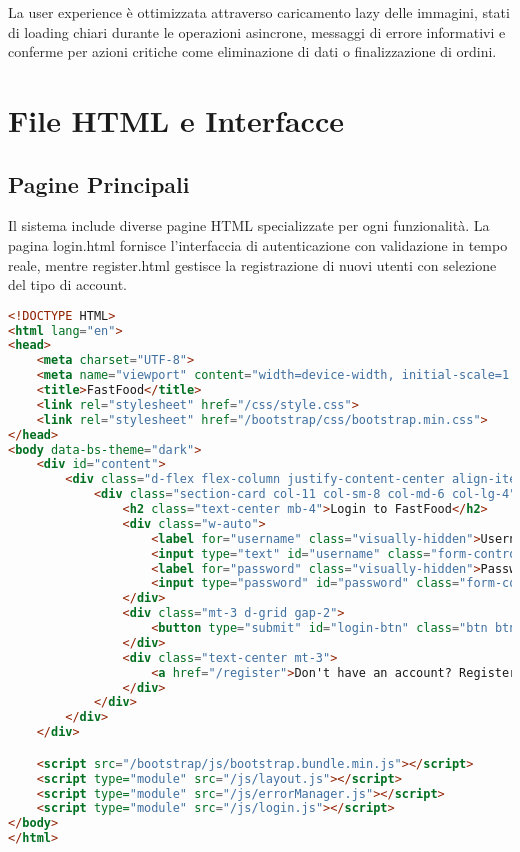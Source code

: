 \documentclass[12pt,a4paper]{article}
\begin{document}
La user experience è ottimizzata attraverso caricamento lazy delle immagini, stati di loading chiari durante le operazioni asincrone, messaggi di errore informativi e conferme per azioni critiche come eliminazione di dati o finalizzazione di ordini.

\section{File HTML e Interfacce}

\subsection{Pagine Principali}

Il sistema include diverse pagine HTML specializzate per ogni funzionalità. La pagina login.html fornisce l'interfaccia di autenticazione con validazione in tempo reale, mentre register.html gestisce la registrazione di nuovi utenti con selezione del tipo di account.

\begin{lstlisting}[language=HTML, caption=Pagina di login principale]
<!DOCTYPE HTML>
<html lang="en">
<head>
    <meta charset="UTF-8">
    <meta name="viewport" content="width=device-width, initial-scale=1.0">
    <title>FastFood</title>
    <link rel="stylesheet" href="/css/style.css">
    <link rel="stylesheet" href="/bootstrap/css/bootstrap.min.css">
</head>
<body data-bs-theme="dark">
    <div id="content">
        <div class="d-flex flex-column justify-content-center align-items-center vh-100">
            <div class="section-card col-11 col-sm-8 col-md-6 col-lg-4">
                <h2 class="text-center mb-4">Login to FastFood</h2>
                <div class="w-auto">
                    <label for="username" class="visually-hidden">Username</label>
                    <input type="text" id="username" class="form-control rounded-bottom-0" placeholder="Username" required>
                    <label for="password" class="visually-hidden">Password</label>
                    <input type="password" id="password" class="form-control rounded-top-0" placeholder="Password" required>
                </div>
                <div class="mt-3 d-grid gap-2">
                    <button type="submit" id="login-btn" class="btn btn-primary">Login</button>
                </div>
                <div class="text-center mt-3">
                    <a href="/register">Don't have an account? Register</a>
                </div>
            </div>
        </div>
    </div>

    <script src="/bootstrap/js/bootstrap.bundle.min.js"></script>
    <script type="module" src="/js/layout.js"></script>
    <script type="module" src="/js/errorManager.js"></script>
    <script type="module" src="/js/login.js"></script>
</body>
</html>
\end{lstlisting}
\end{document}
